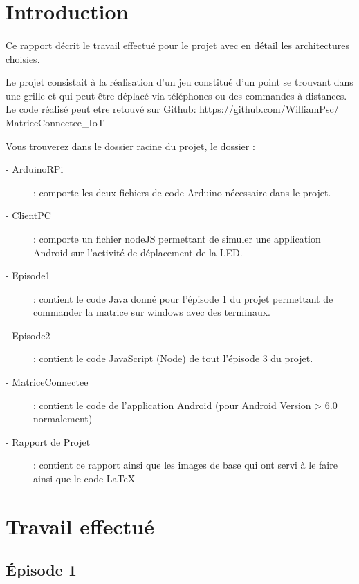 \documentclass[a4paper,12pt]{report}
\begin{document}
	\pagestyle{fancy}
		\chead{}
		\lfoot{}
		\cfoot{\thepage}
		\rfoot{}
		
	\newpage\renewcommand{\contentsname}{Sommaire}
	\tableofcontents

	\newpage
	\section{Introduction}
		\paragraph*{}
		Ce rapport décrit le travail effectué pour le projet avec en détail les architectures choisies.
		
		Le projet consistait à la réalisation d’un jeu constitué d’un point se trouvant dans une grille et qui peut être déplacé via téléphones ou des commandes à distances.
Le code réalisé peut etre retouvé sur Github: https://github.com/WilliamPsc/ MatriceConnectee\_IoT

		Vous trouverez dans le dossier racine du projet, le dossier :
		\begin{description}
			\item[- ArduinoRPi] : comporte les deux fichiers de code Arduino nécessaire dans le projet.
			\item[- ClientPC] : comporte un fichier nodeJS permettant de simuler une application Android sur l'activité de déplacement de la LED.
			\item[- Episode1] : contient le code Java donné pour l'épisode 1 du projet permettant de commander la matrice sur windows avec des terminaux.
			\item[- Episode2] : contient le code JavaScript (Node) de tout l'épisode 3 du projet.
			\item[- MatriceConnectee] : contient le code de l'application Android (pour Android Version > 6.0 normalement) 
			\item[- Rapport de Projet] : contient ce rapport ainsi que les images de base qui ont servi à le faire ainsi que le code \LaTeX
		\end{description}
	
	\section{Travail effectué}
		\subsection{Épisode 1}
\end{document}
